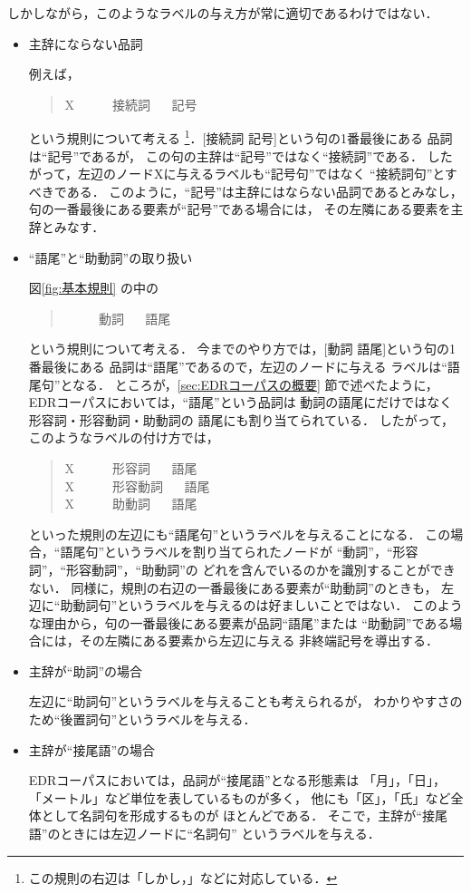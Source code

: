しかしながら，このようなラベルの与え方が常に適切であるわけではない．
\begin{itemize}
\item 主辞にならない品詞

  \quad 例えば，
  \begin{quote}
    X ~~  ~~ 接続詞 ~~ 記号
  \end{quote}
  という規則について考える
  \footnote{
    この規則の右辺は「しかし，」などに対応している．
    }．[接続詞 記号]という句の1番最後にある
  品詞は``記号''であるが，
  この句の主辞は``記号''ではなく``接続詞''である．
  したがって，左辺のノードXに与えるラベルも``記号句''ではなく
  ``接続詞句''とすべきである．
  このように，``記号''は主辞にはならない品詞であるとみなし，
  句の一番最後にある要素が``記号''である場合には，
  その左隣にある要素を主辞とみなす．

\item ``語尾''と``助動詞''の取り扱い

  \quad 図\ref{fig:基本規則} の中の
  \begin{quote}
     ~~  ~~ 動詞 ~~ 語尾
  \end{quote}
  という規則について考える．
  今までのやり方では，[動詞 語尾]という句の1番最後にある
  品詞は``語尾''であるので，左辺のノードに与える
  ラベルは``語尾句''となる．
  ところが，\ref{sec:EDRコーパスの概要} 節で述べたように，
  EDRコーパスにおいては，``語尾''という品詞は
  動詞の語尾にだけではなく形容詞・形容動詞・助動詞の
  語尾にも割り当てられている．
  したがって，このようなラベルの付け方では，
  \begin{quote}
    X ~~  ~~ 形容詞 ~~ 語尾   \\
    X ~~  ~~ 形容動詞 ~~ 語尾 \\
    X ~~  ~~ 助動詞 ~~ 語尾
  \end{quote}
  といった規則の左辺にも``語尾句''というラベルを与えることになる．
  この場合，``語尾句''というラベルを割り当てられたノードが
  ``動詞''，``形容詞''，``形容動詞''，``助動詞''の
  どれを含んでいるのかを識別することができない．
  同様に，規則の右辺の一番最後にある要素が``助動詞''のときも，
  左辺に``助動詞句''というラベルを与えるのは好ましいことではない．
  このような理由から，句の一番最後にある要素が品詞``語尾''または
  ``助動詞''である場合には，その左隣にある要素から左辺に与える
  非終端記号を導出する．

\item 主辞が``助詞''の場合
  
  \quad 左辺に``助詞句''というラベルを与えることも考えられるが，
  わかりやすさのため``後置詞句''というラベルを与える．

\item 主辞が``接尾語''の場合

  \quad EDRコーパスにおいては，品詞が``接尾語''となる形態素は
  「月」，「日」，「メートル」など単位を表しているものが多く，
  他にも「区」，「氏」など全体として名詞句を形成するものが
  ほとんどである．
  そこで，主辞が``接尾語''のときには左辺ノードに``名詞句''
  というラベルを与える．
\end{itemize}

